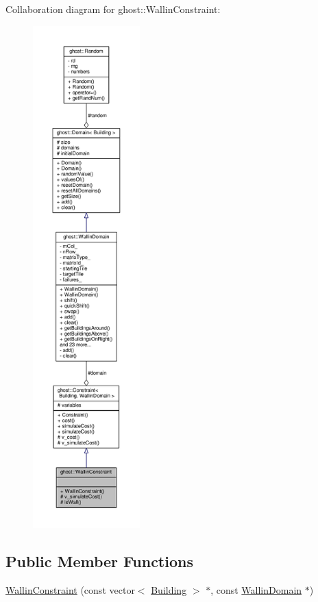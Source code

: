 Collaboration diagram for ghost\-:\-:Wallin\-Constraint\-:
\nopagebreak
\begin{figure}[H]
\begin{center}
\leavevmode
\includegraphics[height=550pt]{classghost_1_1WallinConstraint__coll__graph}
\end{center}
\end{figure}
\subsection*{Public Member Functions}
\begin{DoxyCompactItemize}
\item 
\hyperlink{classghost_1_1WallinConstraint_a943d4dcca2afb3cd72cb1049a7f197ff}{Wallin\-Constraint} (const vector$<$ \hyperlink{classghost_1_1Building}{Building} $>$ $\ast$, const \hyperlink{classghost_1_1WallinDomain}{Wallin\-Domain} $\ast$)
\end{DoxyCompactItemize}
